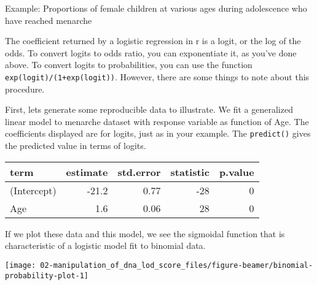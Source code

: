 \documentclass[11pt,dvipsnames,ignorenonframetext,aspectratio=169]{beamer}
\begin{document}
\begin{frame}[fragile]{Example: Proportions of female children at
various ages during adolescence who have reached menarche}
\protect\hypertarget{example-proportions-of-female-children-at-various-ages-during-adolescence-who-have-reached-menarche}{}

The coefficient returned by a logistic regression in r is a logit, or
the log of the odds. To convert logits to odds ratio, you can
exponentiate it, as you've done above. To convert logits to
probabilities, you can use the function
\texttt{exp(logit)/(1+exp(logit))}. However, there are some things to
note about this procedure.

First, lets generate some reproducible data to illustrate. We fit a
generalized linear model to menarche dataset with response variable as
function of Age. The coefficients displayed are for logits, just as in
your example. The \texttt{predict()} gives the predicted value in terms
of logits.

\end{frame}

\begin{frame}{}
\protect\hypertarget{section-12}{}

\begin{table}[H]
\centering\begingroup\fontsize{6}{8}\selectfont

\begin{tabular}{lrrrr}
\toprule
term & estimate & std.error & statistic & p.value\\
\midrule
\rowcolor{gray!6}  (Intercept) & -21.2 & 0.77 & -28 & 0\\
Age & 1.6 & 0.06 & 28 & 0\\
\bottomrule
\end{tabular}
\endgroup{}
\end{table}

If we plot these data and this model, we see the sigmoidal function that
is characteristic of a logistic model fit to binomial data.

\begin{center}\texttt{[image: 02-manipulation\_of\_dna\_lod\_score\_files/figure-beamer/binomial-probability-plot-1]} \end{center}

\end{frame}
\end{document}
